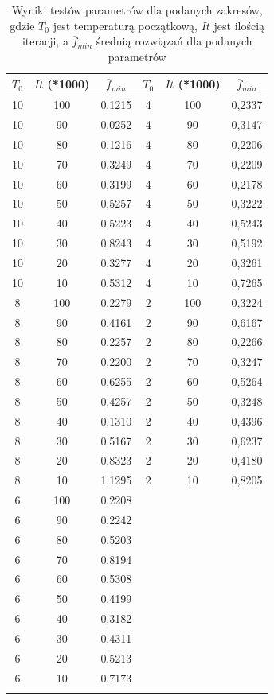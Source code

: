 \documentclass[twoside]{projektInzynierskiMS1}
\newcommand{\si}{ś}
\begin{document}
\begin{table}[htbp]\centering
\def\sym#1{\ifmmode^{#1}\else\(^{#1}\)\fi}
\caption{Wyniki testów parametrów dla podanych zakresów, gdzie $T_0$ jest temperaturą początkową, $It$ jest ilo\si cią iteracji, a $\overline{f}_{min}$ \si rednią rozwiązań dla podanych parametrów}
\begin{tabular}{|c|c|c||c|c|c|} 
                  \hline
                   $T_0$
                  & $It$ (*1000)
                  &$\overline{f}_{min}$ 
& $T_0$
 & $It$ (*1000)
 &$\overline{f}_{min}$ \\ \hline
10 & 100 & 0,1215 & 4 & 100 & 0,2337 \\ \hline
10 & 90 & 0,0252 & 4 & 90 & 0,3147 \\ \hline
10 & 80 & 0,1216 & 4 & 80 & 0,2206 \\ \hline
10 & 70 & 0,3249& 4 & 70 & 0,2209 \\ \hline 
10 & 60 & 0,3199 & 4 & 60 & 0,2178 \\ \hline 
10 & 50 & 0,5257 & 4 & 50 & 0,3222 \\ \hline
10 & 40 & 0,5223 & 4 & 40 & 0,5243 \\ \hline 
10 & 30 & 0,8243 & 4 & 30 & 0,5192 \\ \hline
10 & 20 & 0,3277 & 4 & 20 & 0,3261 \\ \hline 
10 & 10 & 0,5312 & 4 & 10 & 0,7265 \\ \Xhline{3\arrayrulewidth}

8 & 100 & 0,2279 & 2 & 100 & 0,3224 \\ \hline 
8 & 90 & 0,4161 & 2 & 90 & 0,6167 \\ \hline 
8 & 80 & 0,2257 & 2 & 80 & 0,2266 \\ \hline 
8 & 70 & 0,2200 & 2 & 70 & 0,3247 \\ \hline 
8 & 60 & 0,6255 & 2 & 60 & 0,5264 \\ \hline 
8 & 50 & 0,4257 & 2 & 50 & 0,3248 \\ \hline 
8 & 40 & 0,1310 & 2 & 40 & 0,4396 \\ \hline
8 & 30 & 0,5167 & 2 & 30 & 0,6237 \\ \hline
8 & 20 & 0,8323 & 2 & 20 & 0,4180 \\ \hline
8 & 10 & 1,1295 & 2 & 10 & 0,8205 \\ \Xhline{3\arrayrulewidth}

6 & 100 & 0,2208 \\ \hline 
6 & 90 & 0,2242 \\ \hline 
6 & 80 & 0,5203 \\ \hline 
6 & 70 & 0,8194 \\ \hline 
6 & 60 & 0,5308 \\ \hline 
6 & 50 & 0,4199\\ \hline 
6 & 40 & 0,3182 \\ \hline 
6 & 30 & 0,4311 \\ \hline 
6 & 20 & 0,5213 \\ \hline 
6 & 10 & 0,7173 \\ \Xhline{3\arrayrulewidth}


\end{tabular} 
\end{table}
\end{document}
